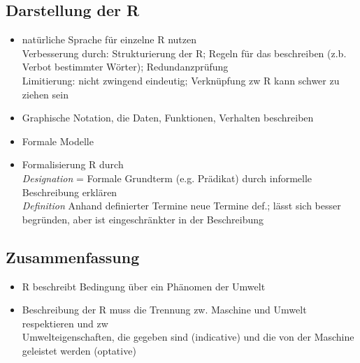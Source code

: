 \subsection{Darstellung der R}
\begin{itemize}
	\item natürliche Sprache für einzelne R nutzen\\
	Verbesserung durch: Strukturierung der R; Regeln für das beschreiben (z.b. Verbot bestimmter Wörter); Redundanzprüfung\\
	Limitierung: nicht zwingend eindeutig; Verknüpfung zw R kann schwer zu ziehen sein
	\item Graphische Notation, die Daten, Funktionen, Verhalten beschreiben
	\item Formale Modelle
	\item Formalisierung R durch\\
	\textit{Designation} = Formale Grundterm (e.g. Prädikat) durch informelle Beschreibung erklären\\
	\textit{Definition} Anhand definierter Termine neue Termine def.; lässt sich besser begründen, aber ist eingeschränkter in der Beschreibung
	
\end{itemize}

\subsection{Zusammenfassung}
\begin{itemize}
	\item R beschreibt Bedingung über ein Phänomen der Umwelt
	\item Beschreibung der R muss die Trennung zw. Maschine und Umwelt respektieren und zw\\
	Umwelteigenschaften, die gegeben sind (indicative) und die von der Maschine geleistet werden (optative)
\end{itemize}
